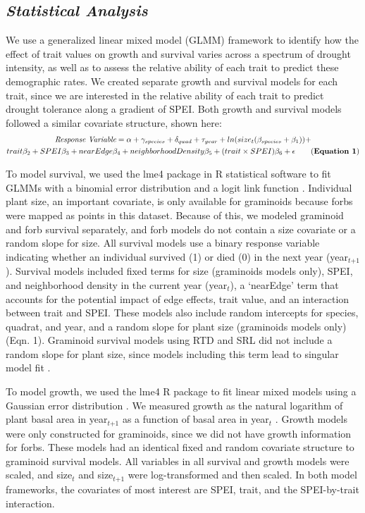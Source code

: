 \documentclass[12pt, letterpaper]{article}
\begin{document}
\subsection{\textit{Statistical Analysis}} We use a generalized linear mixed model (GLMM) framework to identify how the effect of trait values on growth and survival varies across a spectrum of drought intensity, as well as to assess the relative ability of each trait to predict these demographic rates. We created separate growth and survival models for each trait, since we are interested in the relative ability of each trait to predict drought tolerance along a gradient of SPEI. Both growth and survival models followed a similar covariate structure, shown here:
\begin{multline}
\label{surv_eq}
\textit{Response Variable} = \alpha + \gamma_{species}+ \delta_{quad} + \tau_{year} + ln(size_t(\beta_{species} + \beta_1)) +\\ trait\beta_2+ SPEI\beta_3 + nearEdge\beta_4 + neighborhoodDensity\beta_5 + (trait\times SPEI)\beta_6 + \epsilon 
\tag{\textbf{Equation 1}}
\end{multline}

To model survival, we used the lme4 package in R statistical software to fit GLMMs with a binomial error distribution and a logit link function . Individual plant size, an important covariate, is only available for graminoids because forbs were mapped as points in this dataset. Because of this, we modeled graminoid and forb survival separately, and forb models do not contain a size covariate or a random slope for size. All survival models use a binary response variable indicating whether an individual survived (1) or died (0) in the next year (year$_\textit{t+1}$). Survival models included fixed terms for size (graminoids models only), SPEI, and neighborhood density in the current year (year$_\textit{t}$), a ‘nearEdge’ term that accounts for the potential impact of edge effects, trait value, and an interaction between trait and SPEI. These models also include random intercepts for species, quadrat, and year, and a random slope for plant size (graminoids models only) (Eqn. 1). Graminoid survival models using RTD and SRL did not include a random slope for plant size, since models including this term lead to singular model fit . 

 To model growth, we used the lme4 R package to fit linear mixed models using a Gaussian error distribution . We measured growth as the natural logarithm of plant basal area in year$_\textit{t+1}$ as a function of basal area in year$_\textit{t}$ . Growth models were only constructed for graminoids, since we did not have growth information for forbs. These models had an identical fixed and random covariate structure to graminoid survival models. All variables in all survival and growth models were scaled, and size$_{\textit{t}}$ and size$_{\textit{t+1}}$ were log-transformed and then scaled. In both model frameworks, the covariates of most interest are SPEI, trait, and the SPEI-by-trait interaction.
 
\end{document}
